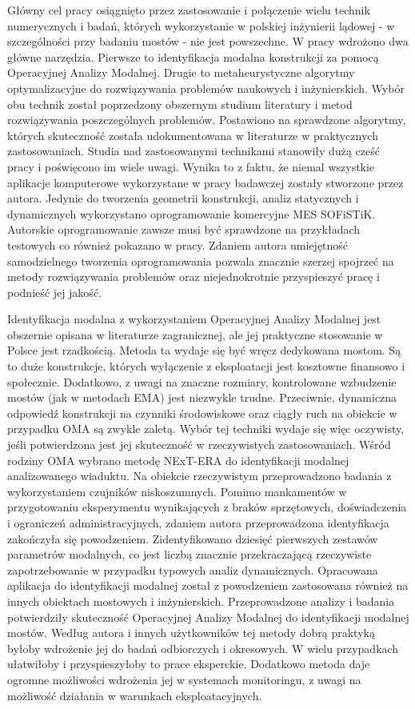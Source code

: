 Główny cel pracy osiągnięto przez zastosowanie i połączenie wielu technik numerycznych i badań, których wykorzystanie w polskiej inżynierii lądowej - w szczególności przy badaniu mostów - nie jest powszechne. W pracy wdrożono dwa główne narzędzia. Pierwsze to identyfikacja modalna konstrukcji za pomocą Operacyjnej Analizy Modalnej. Drugie to metaheurystyczne algorytmy optymalizacyjne do rozwiązywania problemów naukowych i inżynierskich. Wybór obu technik został poprzedzony obszernym studium literatury i metod rozwiązywania poszczególnych problemów. Postawiono na sprawdzone algorytmy, których skuteczność została udokumentowana w literaturze w praktycznych zastosowaniach. Studia nad zastosowanymi technikami stanowiły dużą cześć pracy i poświęcono im wiele uwagi. Wynika to z faktu, że niemal wszystkie aplikacje komputerowe wykorzystane w pracy badawczej zostały stworzone przez autora. Jedynie do tworzenia geometrii konstrukcji, analiz statycznych i dynamicznych wykorzystano oprogramowanie komercyjne MES SOFiSTiK. Autorskie oprogramowanie zawsze musi być sprawdzone na przykładach testowych co również pokazano w pracy. Zdaniem autora umiejętność samodzielnego tworzenia oprogramowania pozwala znacznie szerzej spojrzeć na metody rozwiązywania problemów oraz niejednokrotnie przyspieszyć pracę i podnieść jej jakość.

Identyfikacja modalna z wykorzystaniem Operacyjnej Analizy Modalnej jest obszernie opisana w literaturze zagranicznej, ale jej praktyczne stosowanie w Polsce jest rzadkością. Metoda ta wydaje się być wręcz dedykowana mostom. Są to duże konstrukcje, których wyłączenie z eksploatacji jest kosztowne finansowo i społecznie. Dodatkowo, z uwagi na znaczne rozmiary, kontrolowane wzbudzenie mostów (jak w metodach EMA) jest niezwykle trudne. Przeciwnie, dynamiczna odpowiedź konstrukcji na czynniki środowiskowe oraz ciągły ruch na obiekcie w przypadku OMA są zwykle zaletą. Wybór tej techniki wydaje się więc oczywisty, jeśli potwierdzona jest jej skuteczność w rzeczywistych zastosowaniach. Wśród rodziny OMA wybrano metodę NExT-ERA do identyfikacji modalnej analizowanego wiaduktu. Na obiekcie rzeczywistym przeprowadzono badania z wykorzystaniem czujników niskoszumnych. Pomimo mankamentów w przygotowaniu eksperymentu wynikających z braków sprzętowych, doświadczenia i ograniczeń administracyjnych, zdaniem autora przeprowadzona identyfikacja zakończyła się powodzeniem. Zidentyfikowano dziesięć pierwszych zestawów parametrów modalnych, co jest liczbą znacznie przekraczającą rzeczywiste zapotrzebowanie w przypadku typowych analiz dynamicznych. Opracowana aplikacja do identyfikacji modalnej został z powodzeniem zastosowana również na innych obiektach mostowych i inżynierskich. Przeprowadzone analizy i badania potwierdziły skuteczność Operacyjnej Analizy Modalnej do identyfikacji modalnej mostów. Według autora i innych użytkowników tej metody dobrą praktyką byłoby wdrożenie jej do badań odbiorczych i okresowych. W wielu przypadkach ułatwiłoby i przyspieszyłoby to prace eksperckie. Dodatkowo metoda daje ogromne możliwości wdrożenia jej w systemach monitoringu, z uwagi na możliwość działania w warunkach eksploatacyjnych.

